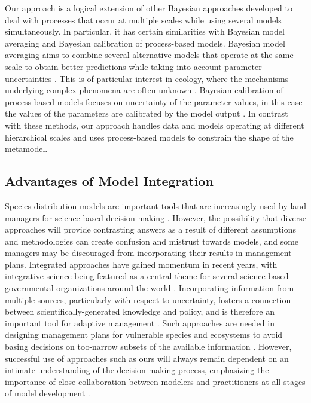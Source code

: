 \documentclass[11pt]{article}
\begin{document}
Our approach is a logical extension of other Bayesian approaches developed to deal with processes that occur at multiple scales while using several models simultaneously. 
In particular, it has certain similarities with Bayesian model averaging and Bayesian calibration of process-based models. 
Bayesian model averaging aims to combine several alternative models that operate at the same scale to obtain better predictions while taking into account parameter uncertainties \citep{Hoeting1999}. This is of particular interest in ecology, where the mechanisms underlying complex phenomena are often unknown \citep[e.g.,][]{Wintle2003, Link2006}. 
Bayesian calibration of process-based models focuses on uncertainty of the parameter values, in this case the values of the parameters are calibrated by the model output \citep{VanOijen2005, Hartig2012}. 
In contrast with these methods, our approach handles data and models operating at different hierarchical scales and uses process-based models to constrain the shape of the metamodel.



\subsection*{Advantages of Model Integration}
Species distribution models are important tools that are increasingly used by land managers for science-based decision-making \citep{Guisan2013}.
However, the possibility that diverse approaches will provide contrasting answers as a result of different assumptions and methodologies can create confusion and mistrust towards models, and some managers may be discouraged from incorporating their results in management plans. 
Integrated approaches have gained momentum in recent years, with integrative science being featured as a central theme for several science-based governmental organizations around the world \citep[e.g.,][]{Bernier2013}. 
Incorporating information from multiple sources, particularly with respect to uncertainty, fosters a connection between scientifically-generated knowledge and policy, and is therefore an important tool for adaptive management \citep[][Fig. \ref{fig:management}]{Rehme2011}.
Such approaches are needed in designing management plans for vulnerable species and ecosystems to avoid basing decisions on too-narrow subsets of the available information \citep{Dawson2011}.
However, successful use of approaches such as ours will always remain dependent on an intimate understanding of the decision-making process, emphasizing the importance of close collaboration between modelers and practitioners at all stages of model development \citep{Guisan2013}.
\end{document}
